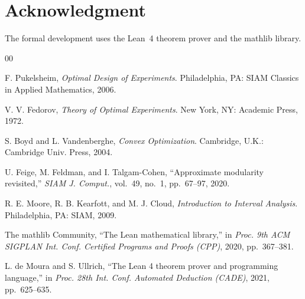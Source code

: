 \section*{Acknowledgment}

The formal development uses the Lean~4 theorem prover and the mathlib library.

\begin{thebibliography}{00}

 F. Pukelsheim, \emph{Optimal Design of Experiments}. Philadelphia,
PA: SIAM Classics in Applied Mathematics, 2006.

 V. V. Fedorov, \emph{Theory of Optimal Experiments}. New York, NY:
Academic Press, 1972.

 S. Boyd and L. Vandenberghe, \emph{Convex Optimization}. Cambridge,
U.K.: Cambridge Univ. Press, 2004.

 U. Feige, M. Feldman, and I. Talgam-Cohen, ``Approximate modularity
revisited,'' \emph{SIAM J. Comput.}, vol.~49, no.~1, pp.~67--97, 2020.

 R. E. Moore, R. B. Kearfott, and M. J. Cloud, \emph{Introduction to
Interval Analysis}. Philadelphia, PA: SIAM, 2009.

 The mathlib Community, ``The Lean mathematical library,'' in
\emph{Proc. 9th ACM SIGPLAN Int. Conf. Certified Programs and Proofs (CPP)}, 2020,
pp.~367--381.

 L. de Moura and S. Ullrich, ``The Lean 4 theorem prover and
programming language,'' in \emph{Proc. 28th Int. Conf. Automated Deduction (CADE)}, 2021,
pp.~625--635.

\end{thebibliography}




